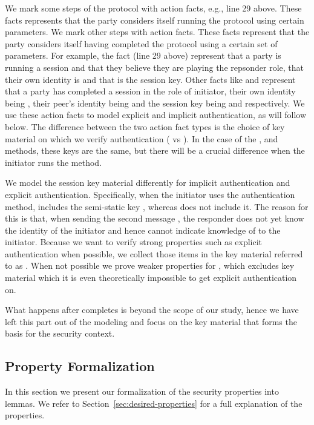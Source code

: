 We mark some steps of the protocol with  action facts, e.g., line 29
above.
%
These facts represents that the party considers itself running the
protocol using certain parameters.
%
We mark other steps with  action facts.
%
These facts represent that the party considers itself having
completed the protocol using a certain set of parameters.
%
For example, the fact  (line 29 above)
represent that a party is running a session and that they believe
they are playing the repsonder role, that their own identity is 
and that  is the session key.
%
Other facts like 
%
and  represent that a party has completed
a session in the role of initiator, their own identity being , their
peer's identity being  and the session key being  and
 respectively.
%
We use these action facts to model explicit and implicit authentication, as will
follow below.
%
The difference between the two  action fact types is the choice of
key material on which we verify authentication ( vs ).
%
In the case of the \mSigSig{}, \mSigStat{} and \mPskPsk{} methods, these keys
are the same, but there will be a crucial difference when the initiator runs
the \mStat{} method.
%

We model the session key material differently for implicit authentication and
explicit authentication.
%
Specifically, when the initiator uses the \mStat{} authentication method,
 includes the semi-static key \mGiy{}, whereas  does not
include it.
%
The reason for this is that, when sending the second message \mMsgtwo{}, the
responder does not yet know the identity of the initiator and hence cannot
indicate knowledge of \mGiy{} to the initiator.
%
Because we want to verify strong properties such as explicit authentication
when possible, we collect those items in the key material referred to as
.
%
When not possible we prove weaker properties for , which excludes
key material which it is even theoretically impossible to get explicit
authentication on.
%

What happens after \mEdhoc{} completes is beyond the scope of our study, hence
we have left this part out of the modeling and focus on the key material
that forms the basis for the \mOscore{} security context.
%

\subsection{Property Formalization}
\label{sec:propertyFormalization}
In this section we present our formalization of the security properties into\\
\mTamarin{} lemmas.
%
We refer to Section~\ref{sec:desired-properties} for a full explanation of the
properties.
\\

